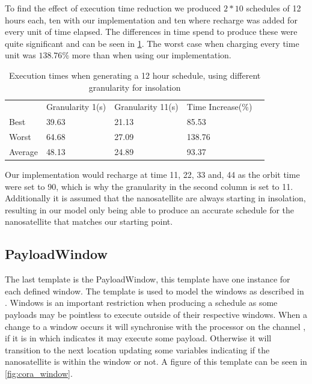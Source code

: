 To find the effect of execution time reduction we produced $2 * 10$ schedules of 12 hours each, ten with our implementation and ten where recharge was added for every unit of time elapsed.
The differences in time spend to produce these were quite significant and can be seen in \cref{tab:runTimes}.
The worst case when charging every time unit was $138.76\%$ more than when using our implementation.
\begin{table}[H]
	\centering
	\begin{tabular}{lllll}
		& Granularity 1(s)           & Granularity 11(s)          & Time Increase(\%)           &  \\ \cline{2-4}
		\multicolumn{1}{l|}{Best}    & \multicolumn{1}{l|}{39.63} & \multicolumn{1}{l|}{21.13} & \multicolumn{1}{l|}{85.53}  &  \\
		\multicolumn{1}{l|}{Worst}   & \multicolumn{1}{l|}{64.68} & \multicolumn{1}{l|}{27.09} & \multicolumn{1}{l|}{138.76} &  \\
		\multicolumn{1}{l|}{Average} & \multicolumn{1}{l|}{48.13} & \multicolumn{1}{l|}{24.89} & \multicolumn{1}{l|}{93.37}  &  \\ \cline{2-4}
	\end{tabular}
		\caption{Execution times when generating a 12 hour schedule, using different granularity for insolation}
		\label{tab:runTimes}
\end{table}
Our implementation would recharge at time 11, 22, 33 and, 44 as the orbit time were set to 90, which is why the granularity in the second column is set to 11.
Additionally it is assumed that the nanosatellite are always starting in insolation, resulting in our model only being able to produce an accurate schedule for the nanosatellite that matches our starting point.


\subsection*{PayloadWindow}\label{ssec:cora_tw}
The last template is the PayloadWindow, this template have one instance for each defined window.
The template is used to model the windows as described in .
Windows is an important restriction when producing a schedule as some payloads may be pointless to execute outside of their respective windows.
When a change to a window occurs it will synchronise with the processor on the channel , if it is in  which indicates it may execute some payload.
Otherwise it will transition to the next location updating some variables indicating if the nanosatellite is within the window or not.
A figure of this template can be seen in \cref{fig:cora_window}.\\
